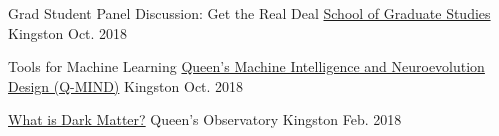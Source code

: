 \begin{cvhonors}
  \cvhonor
    {Grad Student Panel Discussion: Get the Real Deal} %
    {\href{https://www.queensu.ca/sgs/}{School of Graduate Studies}} %
    {Kingston} %
    {Oct. 2018} %

  \cvhonor
    {Tools for Machine Learning} %
    {\href{http://qmind.ca/}{Queen's Machine Intelligence and Neuroevolution Design (Q-MIND)}} %
    {Kingston} %
    {Oct. 2018} %
    
  \cvhonor
    {\href{http://observatory.phy.queensu.ca/index.html}{What is Dark Matter?}} %
    {Queen's Observatory} %
    {Kingston} %
    {Feb. 2018} %
        
\end{cvhonors}


    
    
    
    
        
    
